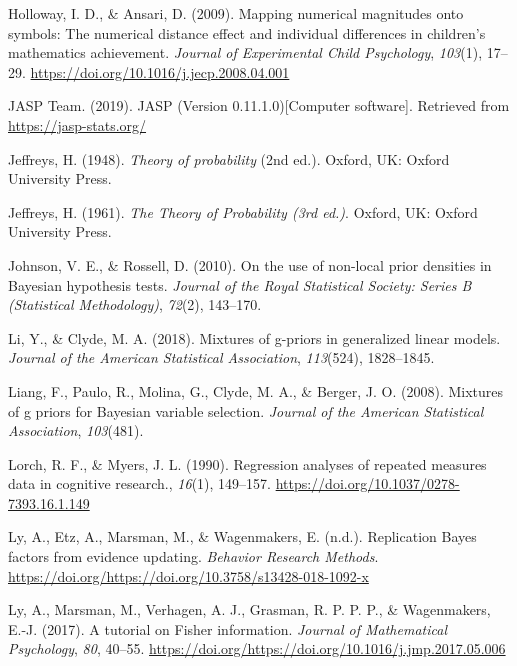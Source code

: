 \documentclass[english,,doc,floatsintext]{apa6}
\begin{document}
\leavevmode\hypertarget{ref-hollowayAnsari2009}{}%
Holloway, I. D., \& Ansari, D. (2009). Mapping numerical magnitudes onto symbols: The numerical distance effect and individual differences in children's mathematics achievement. \emph{Journal of Experimental Child Psychology}, \emph{103}(1), 17--29. \url{https://doi.org/10.1016/j.jecp.2008.04.001}

\leavevmode\hypertarget{ref-jaspSoftware}{}%
JASP Team. (2019). JASP (Version 0.11.1.0){[}Computer software{]}. Retrieved from \url{https://jasp-stats.org/}

\leavevmode\hypertarget{ref-jeffreys1948theory2}{}%
Jeffreys, H. (1948). \emph{Theory of probability} (2nd ed.). Oxford, UK: Oxford University Press.

\leavevmode\hypertarget{ref-jeffreys1961}{}%
Jeffreys, H. (1961). \emph{The Theory of Probability (3rd ed.)}. Oxford, UK: Oxford University Press.

\leavevmode\hypertarget{ref-johnson2010use}{}%
Johnson, V. E., \& Rossell, D. (2010). On the use of non-local prior densities in Bayesian hypothesis tests. \emph{Journal of the Royal Statistical Society: Series B (Statistical Methodology)}, \emph{72}(2), 143--170.

\leavevmode\hypertarget{ref-li2018mixtures}{}%
Li, Y., \& Clyde, M. A. (2018). Mixtures of g-priors in generalized linear models. \emph{Journal of the American Statistical Association}, \emph{113}(524), 1828--1845.

\leavevmode\hypertarget{ref-liang2008mixtures}{}%
Liang, F., Paulo, R., Molina, G., Clyde, M. A., \& Berger, J. O. (2008). Mixtures of g priors for Bayesian variable selection. \emph{Journal of the American Statistical Association}, \emph{103}(481).

\leavevmode\hypertarget{ref-lorch1990}{}%
Lorch, R. F., \& Myers, J. L. (1990). Regression analyses of repeated measures data in cognitive research., \emph{16}(1), 149--157. \url{https://doi.org/10.1037/0278-7393.16.1.149}

\leavevmode\hypertarget{ref-ly2017replication}{}%
Ly, A., Etz, A., Marsman, M., \& Wagenmakers, E. (n.d.). Replication Bayes factors from evidence updating. \emph{Behavior Research Methods}. \url{https://doi.org/https://doi.org/10.3758/s13428-018-1092-x}

\leavevmode\hypertarget{ref-ly2017tutorial}{}%
Ly, A., Marsman, M., Verhagen, A. J., Grasman, R. P. P. P., \& Wagenmakers, E.-J. (2017). A tutorial on Fisher information. \emph{Journal of Mathematical Psychology}, \emph{80}, 40--55. \url{https://doi.org/https://doi.org/10.1016/j.jmp.2017.05.006}
\end{document}
